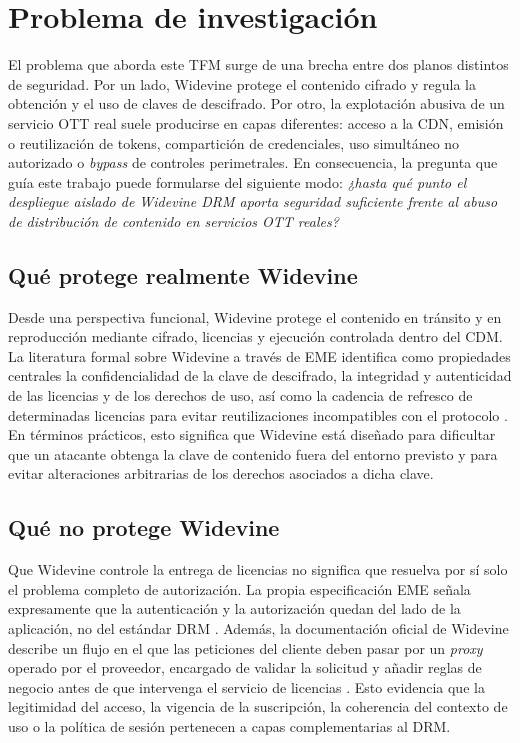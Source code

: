 \section{Problema de investigación}

El problema que aborda este TFM surge de una brecha entre dos planos distintos de seguridad. Por un lado, Widevine protege el contenido cifrado y regula la obtención y el uso de claves de descifrado. Por otro, la explotación abusiva de un servicio OTT real suele producirse en capas diferentes: acceso a la CDN, emisión o reutilización de tokens, compartición de credenciales, uso simultáneo no autorizado o \textit{bypass} de controles perimetrales. En consecuencia, la pregunta que guía este trabajo puede formularse del siguiente modo: \textit{¿hasta qué punto el despliegue aislado de Widevine DRM aporta seguridad suficiente frente al abuso de distribución de contenido en servicios OTT reales?}

\subsection{Qué protege realmente Widevine}

Desde una perspectiva funcional, Widevine protege el contenido en tránsito y en reproducción mediante cifrado, licencias y ejecución controlada dentro del CDM. La literatura formal sobre Widevine a través de EME identifica como propiedades centrales la confidencialidad de la clave de descifrado, la integridad y autenticidad de las licencias y de los derechos de uso, así como la cadencia de refresco de determinadas licencias para evitar reutilizaciones incompatibles con el protocolo \cite{delaune2024}. En términos prácticos, esto significa que Widevine está diseñado para dificultar que un atacante obtenga la clave de contenido fuera del entorno previsto y para evitar alteraciones arbitrarias de los derechos asociados a dicha clave.

\subsection{Qué no protege Widevine}

Que Widevine controle la entrega de licencias no significa que resuelva por sí solo el problema completo de autorización. La propia especificación EME señala expresamente que la autenticación y la autorización quedan del lado de la aplicación, no del estándar DRM \cite{w3ceme2026}. Además, la documentación oficial de Widevine describe un flujo en el que las peticiones del cliente deben pasar por un \textit{proxy} operado por el proveedor, encargado de validar la solicitud y añadir reglas de negocio antes de que intervenga el servicio de licencias \cite{widevine2024}. Esto evidencia que la legitimidad del acceso, la vigencia de la suscripción, la coherencia del contexto de uso o la política de sesión pertenecen a capas complementarias al DRM.

